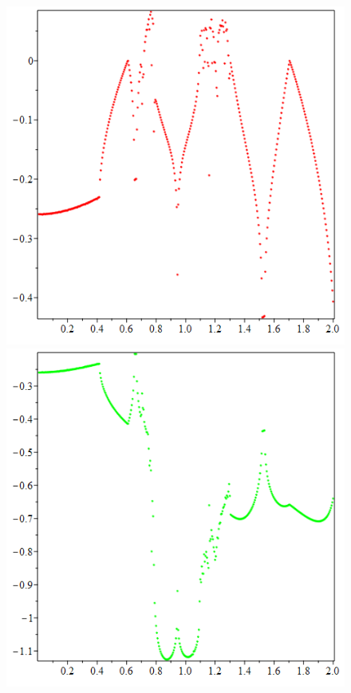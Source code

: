 \documentclass[10pt,a4paper]{article}
\begin{document}
	\begin{figure}[h]
		\centering
		{\includegraphics[scale=0.2]{lyapunov1 0.005}}
		{\includegraphics[scale=0.2]{lyapunov2 0.005}}

\end{figure}
\end{document}
